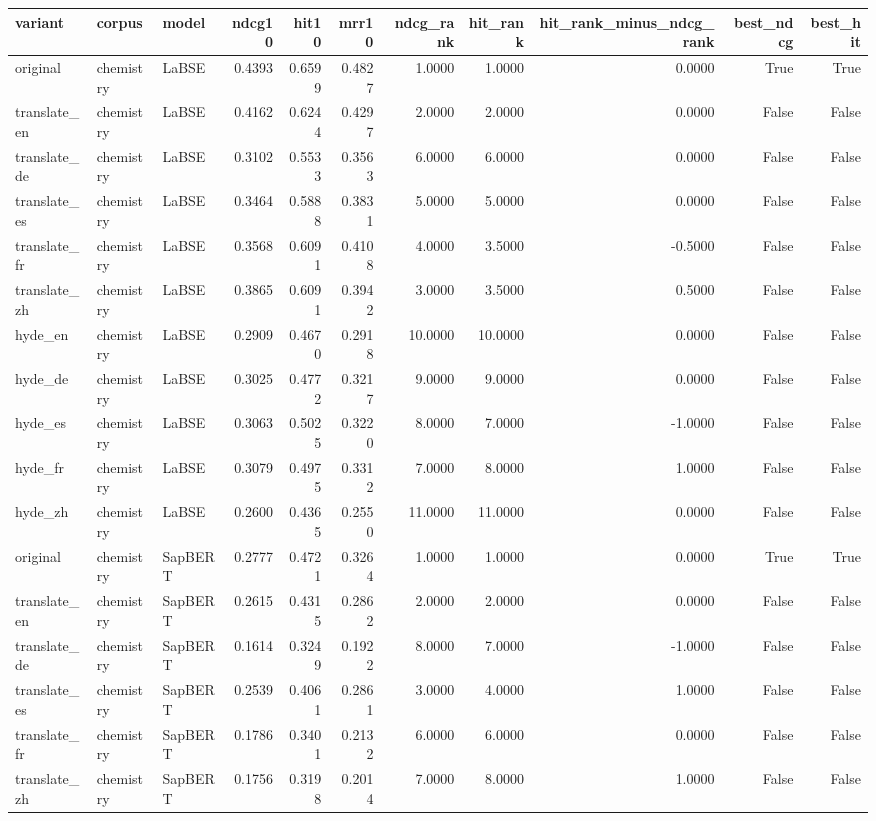 \begin{tabular}{lllrrrrrrrr}
\toprule
variant & corpus & model & ndcg10 & hit10 & mrr10 & ndcg\_rank & hit\_rank & hit\_rank\_minus\_ndcg\_rank & best\_ndcg & best\_hit \\
\midrule
original & chemistry & LaBSE & 0.4393 & 0.6599 & 0.4827 & 1.0000 & 1.0000 & 0.0000 & True & True \\
translate\_en & chemistry & LaBSE & 0.4162 & 0.6244 & 0.4297 & 2.0000 & 2.0000 & 0.0000 & False & False \\
translate\_de & chemistry & LaBSE & 0.3102 & 0.5533 & 0.3563 & 6.0000 & 6.0000 & 0.0000 & False & False \\
translate\_es & chemistry & LaBSE & 0.3464 & 0.5888 & 0.3831 & 5.0000 & 5.0000 & 0.0000 & False & False \\
translate\_fr & chemistry & LaBSE & 0.3568 & 0.6091 & 0.4108 & 4.0000 & 3.5000 & -0.5000 & False & False \\
translate\_zh & chemistry & LaBSE & 0.3865 & 0.6091 & 0.3942 & 3.0000 & 3.5000 & 0.5000 & False & False \\
hyde\_en & chemistry & LaBSE & 0.2909 & 0.4670 & 0.2918 & 10.0000 & 10.0000 & 0.0000 & False & False \\
hyde\_de & chemistry & LaBSE & 0.3025 & 0.4772 & 0.3217 & 9.0000 & 9.0000 & 0.0000 & False & False \\
hyde\_es & chemistry & LaBSE & 0.3063 & 0.5025 & 0.3220 & 8.0000 & 7.0000 & -1.0000 & False & False \\
hyde\_fr & chemistry & LaBSE & 0.3079 & 0.4975 & 0.3312 & 7.0000 & 8.0000 & 1.0000 & False & False \\
hyde\_zh & chemistry & LaBSE & 0.2600 & 0.4365 & 0.2550 & 11.0000 & 11.0000 & 0.0000 & False & False \\
original & chemistry & SapBERT & 0.2777 & 0.4721 & 0.3264 & 1.0000 & 1.0000 & 0.0000 & True & True \\
translate\_en & chemistry & SapBERT & 0.2615 & 0.4315 & 0.2862 & 2.0000 & 2.0000 & 0.0000 & False & False \\
translate\_de & chemistry & SapBERT & 0.1614 & 0.3249 & 0.1922 & 8.0000 & 7.0000 & -1.0000 & False & False \\
translate\_es & chemistry & SapBERT & 0.2539 & 0.4061 & 0.2861 & 3.0000 & 4.0000 & 1.0000 & False & False \\
translate\_fr & chemistry & SapBERT & 0.1786 & 0.3401 & 0.2132 & 6.0000 & 6.0000 & 0.0000 & False & False \\
translate\_zh & chemistry & SapBERT & 0.1756 & 0.3198 & 0.2014 & 7.0000 & 8.0000 & 1.0000 & False & False \\

\end{tabular}

